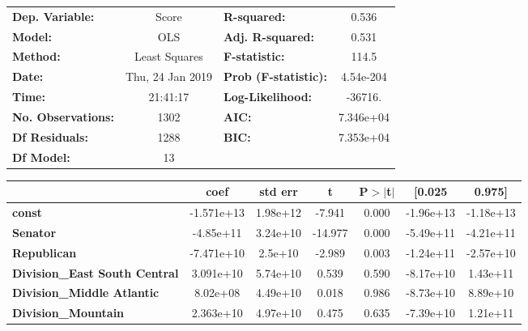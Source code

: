 \begin{center}
\begin{tabular}{lclc}
\toprule
\textbf{Dep. Variable:}               &      Score       & \textbf{  R-squared:         } &     0.536   \\
\textbf{Model:}                       &       OLS        & \textbf{  Adj. R-squared:    } &     0.531   \\
\textbf{Method:}                      &  Least Squares   & \textbf{  F-statistic:       } &     114.5   \\
\textbf{Date:}                        & Thu, 24 Jan 2019 & \textbf{  Prob (F-statistic):} & 4.54e-204   \\
\textbf{Time:}                        &     21:41:17     & \textbf{  Log-Likelihood:    } &   -36716.   \\
\textbf{No. Observations:}            &        1302      & \textbf{  AIC:               } & 7.346e+04   \\
\textbf{Df Residuals:}                &        1288      & \textbf{  BIC:               } & 7.353e+04   \\
\textbf{Df Model:}                    &          13      & \textbf{                     } &             \\
\bottomrule
\end{tabular}
\begin{tabular}{lcccccc}
                                      & \textbf{coef} & \textbf{std err} & \textbf{t} & \textbf{P$>$$|$t$|$} & \textbf{[0.025} & \textbf{0.975]}  \\
\midrule
\textbf{const}                        &   -1.571e+13  &     1.98e+12     &    -7.941  &         0.000        &    -1.96e+13    &    -1.18e+13     \\
\textbf{Senator}                      &    -4.85e+11  &     3.24e+10     &   -14.977  &         0.000        &    -5.49e+11    &    -4.21e+11     \\
\textbf{Republican}                   &   -7.471e+10  &      2.5e+10     &    -2.989  &         0.003        &    -1.24e+11    &    -2.57e+10     \\
\textbf{Division\_East South Central} &    3.091e+10  &     5.74e+10     &     0.539  &         0.590        &    -8.17e+10    &     1.43e+11     \\
\textbf{Division\_Middle Atlantic}    &     8.02e+08  &     4.49e+10     &     0.018  &         0.986        &    -8.73e+10    &     8.89e+10     \\
\textbf{Division\_Mountain}           &    2.363e+10  &     4.97e+10     &     0.475  &         0.635        &    -7.39e+10    &     1.21e+11     \\

\end{tabular}
\end{center}
